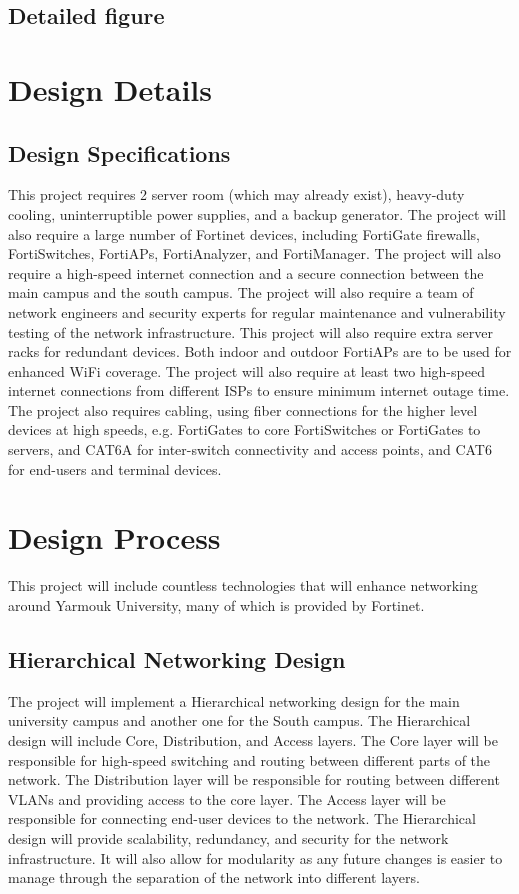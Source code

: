 \documentclass[12pt]{report}
\begin{document}
\subsection{Detailed figure}

\section{Design Details}
\subsection{Design Specifications}
This project requires 2 server room (which may already exist), heavy-duty cooling, uninterruptible power supplies, and a backup generator. The project will also require a large number of Fortinet devices, including FortiGate firewalls, FortiSwitches, FortiAPs, FortiAnalyzer, and FortiManager. The project will also require a high-speed internet connection and a secure connection between the main campus and the south campus. The project will also require a team of network engineers and security experts for regular maintenance and vulnerability testing of the network infrastructure. This project will also require extra server racks for redundant devices. Both indoor and outdoor FortiAPs are to be used for enhanced WiFi coverage. The project will also require at least two high-speed internet connections from different ISPs to ensure minimum internet outage time. The project also requires cabling, using fiber connections for the higher level devices at high speeds, e.g. FortiGates to core FortiSwitches or FortiGates to servers, and CAT6A for inter-switch connectivity and access points, and CAT6 for end-users and terminal devices.

\section{Design Process}
This project will include countless technologies that will enhance networking around Yarmouk University, many of which is provided by Fortinet.
\subsection{Hierarchical Networking Design}
The project will implement a Hierarchical networking design for the main university campus and another one for the South campus. The Hierarchical design will include Core, Distribution, and Access layers. The Core layer will be responsible for high-speed switching and routing between different parts of the network. The Distribution layer will be responsible for routing between different VLANs and providing access to the core layer. The Access layer will be responsible for connecting end-user devices to the network. The Hierarchical design will provide scalability, redundancy, and security for the network infrastructure. It will also allow for modularity as any future changes is easier to manage through the separation of the network into different layers. %
\end{document}
